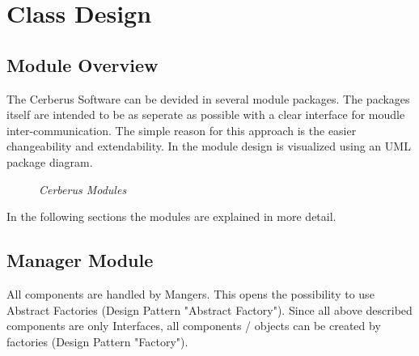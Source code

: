 \chapter{Class Design}

\section{Module Overview}

The Cerberus Software can be devided in several module packages.
The packages itself are intended to be as seperate as possible with a clear interface for moudle inter-communication. 
The simple reason for this approach is the easier changeability and extendability.
In  the module design is visualized using an UML package diagram.

\begin{figure}[ht]
\centering
{} 
\caption[Cerberus Module Design]{\textit{Cerberus Modules}} 
\label{gfx:cerberus_module_design}
\end{figure}

In the following sections the modules are explained in more detail.

\section{Manager Module}

All components are handled by Mangers. This opens the possibility to use Abstract Factories (Design Pattern "Abstract  Factory"). Since all above described components are only Interfaces, all components / objects can be created by factories (Design Pattern "Factory").

